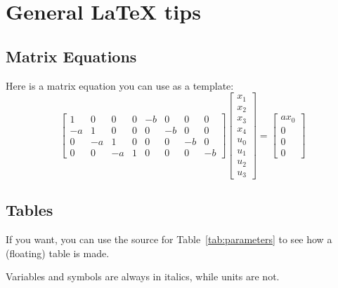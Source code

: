 \section{General LaTeX tips}\label{sec:latex_tips}

\subsection{Matrix Equations}
Here is a matrix equation you can use as a template:
\begin{equation}
\begin{bmatrix}
 1 &  0 &  0 & 0 & -b &  0 &  0 &  0 \\
-a &  1 &  0 & 0 &  0 & -b &  0 &  0 \\
 0 & -a &  1 & 0 &  0 &  0 & -b &  0 \\
 0 &  0 & -a & 1 &  0 &  0 &  0 & -b                                
\end{bmatrix}
\begin{bmatrix} x_1 \\ x_2 \\ x_3 \\ x_4 \\ u_0 \\ u_1 \\ u_2 \\ u_3 \end{bmatrix}
=
\begin{bmatrix}
ax_0 \\ 0 \\ 0 \\ 0      
\end{bmatrix}
\end{equation}

\subsection{Tables}
If you want, you can use the source for Table~\ref{tab:parameters} to see how a (floating) table is made. 

Variables and symbols are always in italics, while units are not.

